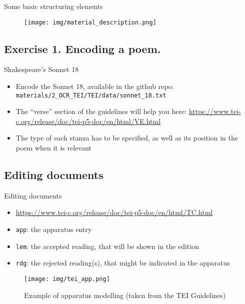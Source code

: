 \documentclass[11pt,aspectratio=1610]{beamer}
\begin{document}
\begin{frame}{Some basic structuring elements}
\begin{center}
\begin{figure}
\texttt{[image: img/material\_description.png]}
\end{figure}
\end{center}
\end{frame}

\subsection{Exercise 1. Encoding a poem.}
\begin{frame}{Shakespeare's Sonnet 18}
\begin{itemize}
\item Encode the Sonnet 18, available in the github repo: \texttt{materials/2\_OCR\_TEI/TEI/data/sonnet\_18.txt}
\item The \enquote{verse} section of the guidelines will help you here:   \url{https://www.tei-c.org/release/doc/tei-p5-doc/en/html/VE.html}
\item The type of each stanza has to be specified, as well as its position in the poem when it is relevant
\end{itemize}
\end{frame}



\subsection{Editing documents}
\begin{frame}{Editing documents}
\begin{itemize}
\item \url{https://www.tei-c.org/release/doc/tei-p5-doc/en/html/TC.html}
\item \texttt{app}: the apparatus entry
\item \texttt{lem}: the accepted reading, that will be shown in the edition
\item \texttt{rdg}: the rejected reading(s), that might be indicated in the apparatus 
\end{itemize}
\begin{center}
\begin{figure}
\texttt{[image: img/tei\_app.png]}
\caption{Example of apparatus modelling (taken from  the TEI Guidelines)}
\end{figure}
\end{center}
\end{frame}
\end{document}
